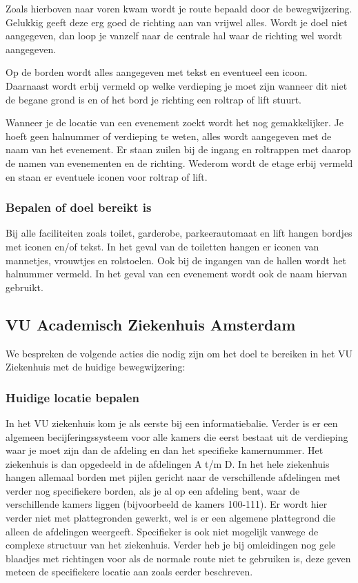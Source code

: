 Zoals hierboven naar voren kwam wordt je route bepaald door de bewegwijzering. Gelukkig geeft deze erg goed de richting aan van vrijwel alles. Wordt je doel niet aangegeven, dan loop je vanzelf naar de centrale hal waar de richting wel wordt aangegeven.

Op de borden wordt alles aangegeven met tekst en eventueel een icoon. Daarnaast wordt erbij vermeld op welke verdieping je moet zijn wanneer dit niet de begane grond is en of het bord je richting een roltrap of lift stuurt.

Wanneer je de locatie van een evenement zoekt wordt het nog gemakkelijker. Je hoeft geen halnummer of verdieping te weten, alles wordt aangegeven met de naam van het evenement. Er staan zuilen bij de ingang en roltrappen met daarop de namen van evenementen en de richting. Wederom wordt de etage erbij vermeld en staan er eventuele iconen voor roltrap of lift.


\subsubsection{Bepalen of doel bereikt is}

Bij alle faciliteiten zoals toilet, garderobe, parkeerautomaat en lift hangen bordjes met iconen en/of tekst. In het geval van de toiletten hangen er iconen van mannetjes, vrouwtjes en rolstoelen. Ook bij de ingangen van de hallen wordt het halnummer vermeld. In het geval van een evenement wordt ook de naam hiervan gebruikt.


\subsection{VU Academisch Ziekenhuis Amsterdam}

We bespreken de volgende acties die nodig zijn om het doel te bereiken in het VU Ziekenhuis met de huidige bewegwijzering:


\subsubsection{Huidige locatie bepalen}

In het VU ziekenhuis kom je als eerste bij een informatiebalie. Verder is er een algemeen becijferingssysteem voor alle kamers die eerst bestaat uit de verdieping waar je moet zijn dan de afdeling en dan het specifieke kamernummer. Het ziekenhuis is dan opgedeeld in de afdelingen A t/m D. In het hele ziekenhuis hangen allemaal borden met pijlen gericht naar de verschillende afdelingen met verder nog specifiekere borden, als je al op een afdeling bent, waar de verschillende kamers liggen (bijvoorbeeld de kamers 100-111). Er wordt hier verder niet met plattegronden gewerkt, wel is er een algemene plattegrond die alleen de afdelingen weergeeft. Specifieker is ook niet mogelijk vanwege de complexe structuur van het ziekenhuis. Verder heb je bij omleidingen nog gele blaadjes met richtingen voor als de normale route niet te gebruiken is, deze geven meteen de specifiekere locatie aan zoals eerder beschreven.


